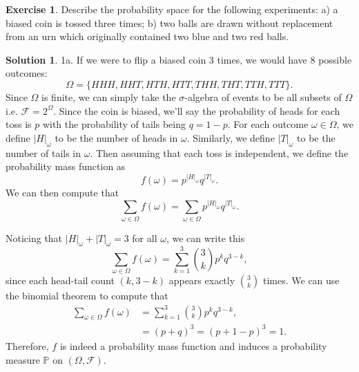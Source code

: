 \documentclass[12pt]{article}
\newcommand{\Prob}{\mathbb{P}}
\newcommand{\calF}{\mathcal{F}}
\newcommand{\abs}[1]{ \left| #1 \right| }
\theoremstyle{definition}
\newtheorem{exer}{Exercise}
\newtheorem{sol}{Solution}
\theoremstyle{remark}
\begin{document}
\begin{exer}
Describe the probability space for the following experiments: a) a biased coin is tossed three times; b)  two balls are drawn without replacement from an urn which originally contained two blue and two red balls.
\end{exer}

\begin{sol}\leavevmode

    1a. If we were to flip a biased coin 3 times, we would have 8 possible outcomes:
\begin{equation}
    \Omega = \{HHH, HHT, HTH, HTT, THH, THT, TTH, TTT \}.
\end{equation}
Since $\Omega$ is finite, we can simply take the $\sigma$-algebra of events to be all subsets of $\Omega$ i.e. $\calF = 2^\Omega$. Since the coin is biased, we'll say the probability of heads for each toss is $p$ with the probability of tails being $q=1-p$. For each outcome $\omega\in\Omega$, we define $\abs{H}_\omega$ to be the number of heads in $\omega$. Similarly, we define $\abs{T}_\omega$ to be the number of tails in $\omega$. Then assuming that each toss is independent, we define the probability mass function as
\begin{equation}
    f(\omega) = p^{\abs{H}_\omega}q^{\abs{T}_\omega}.
\end{equation}
We can then compute that
\begin{equation}
    \sum_{\omega\in\Omega} f(\omega) = \sum_{\omega\in\Omega} p^{\abs{H}_\omega}q^{\abs{T}_\omega}.
\end{equation}

Noticing that $\abs{H}_\omega + \abs{T}_\omega = 3$ for all $\omega$, we can write this 
\begin{equation} 
    \sum_{\omega\in\Omega} f(\omega) = \sum_{k=1}^{3} \binom{3}{k} p^{k}q^{3-k},
\end{equation}
since each head-tail count $(k,3-k)$ appears exactly $\binom{3}{k}$ times. We can use the binomial theorem to compute that
\begin{align}
    \sum_{\omega\in\Omega} f(\omega) &= \sum_{k=1}^{3} \binom{3}{k} p^{k}q^{3-k},\\
                                     &= (p + q)^3 = (p + 1 - p)^3 = 1.
\end{align} Therefore, $f$ is indeed a probability mass function and induces a probability measure $\Prob$ on $(\Omega, \calF)$.

\newpage


\end{sol}
\end{document}
